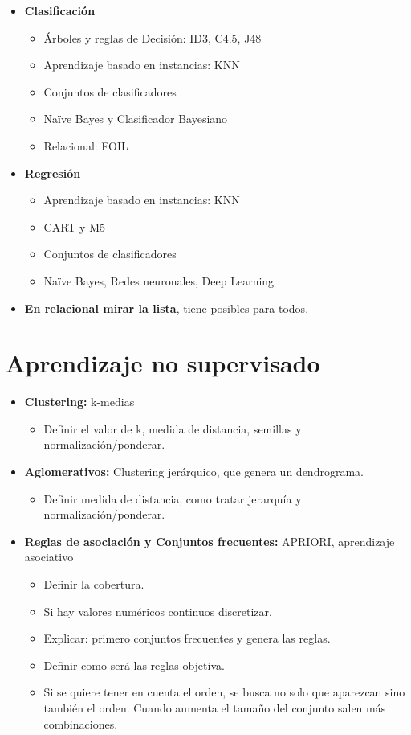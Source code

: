 \documentclass[12pt, twoside, openright]{report} %
\begin{document}
\begin{itemize}
	\item \textbf{Clasificación}
	      \begin{itemize}
		      \item Árboles y reglas de Decisión: ID3, C4.5, J48
		      \item Aprendizaje basado en instancias: KNN
		      \item Conjuntos de clasificadores
		      \item Naïve Bayes y Clasificador Bayesiano
		      \item Relacional: FOIL
	      \end{itemize}
	\item \textbf{Regresión}
	      \begin{itemize}
		      \item Aprendizaje basado en instancias: KNN
		      \item CART y M5
		      \item Conjuntos de clasificadores
		      \item Naïve Bayes, Redes neuronales, Deep Learning
	      \end{itemize}
	\item \textbf{En relacional mirar la lista}, tiene posibles para todos.
\end{itemize}

\section{Aprendizaje no supervisado}
\begin{itemize}
	\item \textbf{Clustering:} k-medias
	      \begin{itemize}
		      \item Definir el valor de k, medida de distancia, semillas y normalización/ponderar.
	      \end{itemize}
	\item \textbf{Aglomerativos:} Clustering jerárquico, que genera un dendrograma.
	      \begin{itemize}
		      \item Definir medida de distancia, como tratar jerarquía y normalización/ponderar.
	      \end{itemize}
	\item \textbf{Reglas de asociación y Conjuntos frecuentes:} APRIORI, aprendizaje asociativo
	      \begin{itemize}
		      \item Definir la cobertura.
		      \item Si hay valores numéricos continuos discretizar.
		      \item Explicar: primero conjuntos frecuentes y genera las reglas.
		      \item Definir como será las reglas objetiva.
		      \item Si se quiere tener en cuenta el orden, se busca no solo que aparezcan sino también el orden. Cuando aumenta el tamaño del conjunto salen más combinaciones.
	      \end{itemize}
\end{itemize}
\end{document}
